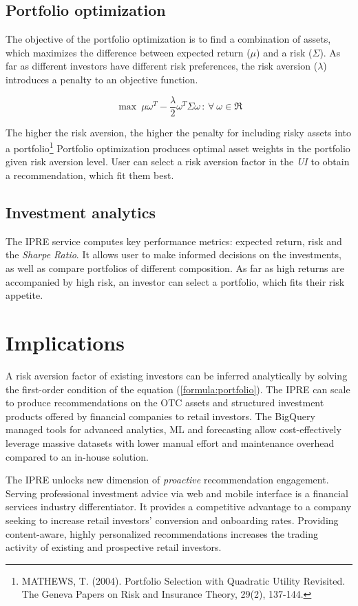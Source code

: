\documentclass[twocolumn]{article}
\begin{document}
\subsection{Portfolio optimization}
    The objective of the portfolio optimization is to find a combination of assets, which maximizes the difference between expected return ($\mu$) and a risk ($\Sigma$).
    As far as different investors have different risk preferences, the risk aversion ($\lambda$) introduces a penalty to an objective function.

    \begin{equation}
        \max \: \mu \omega^{T} - \frac{\lambda}{2} \omega^{T} \Sigma \omega \, : \, \forall \: \omega \in \Re
        \label{formula:portfolio}
    \end{equation}

    The higher the risk aversion, the higher the penalty for including risky assets into a portfolio\footnote{MATHEWS, T. (2004). Portfolio Selection with Quadratic Utility Revisited. The Geneva Papers on Risk and Insurance Theory, 29(2), 137-144.}
    Portfolio optimization produces optimal asset weights in the portfolio given risk aversion level.
    User can select a risk aversion factor in the \emph{UI} to obtain a recommendation, which fit them best.

\subsection{Investment analytics}
    The IPRE service computes key performance metrics: expected return, risk and the \emph{Sharpe Ratio}.
    It allows user to make informed decisions on the investments, as well as compare portfolios of different composition.
    As far as high returns are accompanied by high risk, an investor can select a portfolio, which fits their risk appetite.

\section{Implications}
    A risk aversion factor of existing investors can be inferred analytically by solving the first-order condition of the equation (\ref{formula:portfolio}).
    The IPRE can scale to produce recommendations on the OTC assets and structured investment products offered by financial companies to retail investors.
    The BigQuery managed tools for advanced analytics, ML and forecasting allow cost-effectively leverage massive datasets with lower manual effort and maintenance overhead compared to an in-house solution.

    The IPRE unlocks new dimension of \emph{proactive} recommendation engagement.
    Serving professional investment advice via web and mobile interface is a financial services industry differentiator.
    It provides a competitive advantage to a company seeking to increase retail investors' conversion and onboarding rates.
    Providing content-aware, highly personalized recommendations increases the trading activity of existing and prospective retail investors.
\end{document}
